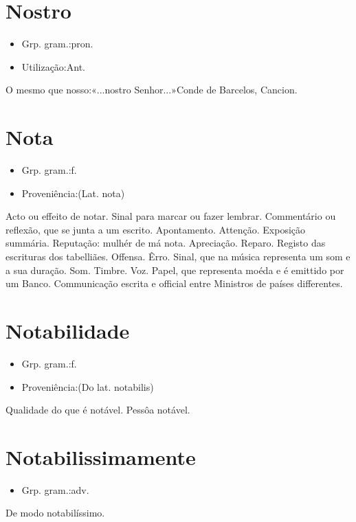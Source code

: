 \section{Nostro}
\begin{itemize}
\item {Grp. gram.:pron.}
\end{itemize}
\begin{itemize}
\item {Utilização:Ant.}
\end{itemize}
O mesmo que \textunderscore nosso\textunderscore :«\textunderscore ...nostro Senhor...\textunderscore »Conde de Barcelos, \textunderscore Cancion.\textunderscore 
\section{Nota}
\begin{itemize}
\item {Grp. gram.:f.}
\end{itemize}
\begin{itemize}
\item {Proveniência:(Lat. \textunderscore nota\textunderscore )}
\end{itemize}
Acto ou effeito de notar.
Sinal para marcar ou fazer lembrar.
Commentário ou reflexão, que se junta a um escrito.
Apontamento.
Attenção.
Exposição summária.
Reputação: \textunderscore mulhér de má nota\textunderscore .
Apreciação.
Reparo.
Registo das escrituras dos tabelliães.
Offensa.
Êrro.
Sinal, que na música representa um som e a sua duração.
Som.
Timbre.
Voz.
Papel, que representa moéda e é emittido por um Banco.
Communicação escrita e official entre Ministros de países differentes.
\section{Notabilidade}
\begin{itemize}
\item {Grp. gram.:f.}
\end{itemize}
\begin{itemize}
\item {Proveniência:(Do lat. \textunderscore notabilis\textunderscore )}
\end{itemize}
Qualidade do que é notável.
Pessôa notável.
\section{Notabilissimamente}
\begin{itemize}
\item {Grp. gram.:adv.}
\end{itemize}
De modo notabilíssimo.
